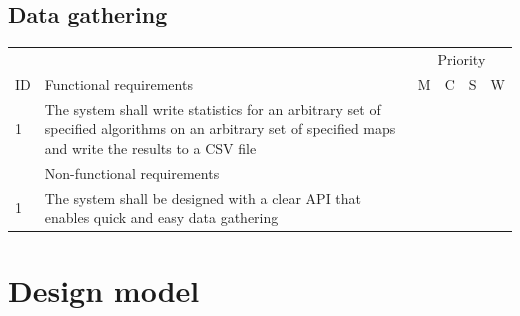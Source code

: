 \documentclass[12pt,notitlepage]{report}
\begin{document}
\subsection{Data gathering}

\begin{center}
    \begin{tabular}{@{}l p{10cm} cccc} \toprule
\multicolumn{2}{r}{~} &\multicolumn{4}{c}{Priority} \\ 
\cmidrule(l){3-6}
ID & Functional requirements & M & C & S & W  \\ \midrule
    1 & The system shall write statistics for an arbitrary set of specified algorithms on an arbitrary set of specified maps and write the results to a CSV file & \cellcolor{green!60} & ~ & ~ & ~\\
    \midrule
    ~ & Non-functional requirements & \multicolumn{4}{r}{}  \\ \midrule
    1 & The system shall be designed with a clear API that enables quick and easy data gathering & \cellcolor{green!60} & ~ & ~ & ~\\ \bottomrule
\end{tabular}
\end{center}

\section {Design model}
\end{document}
